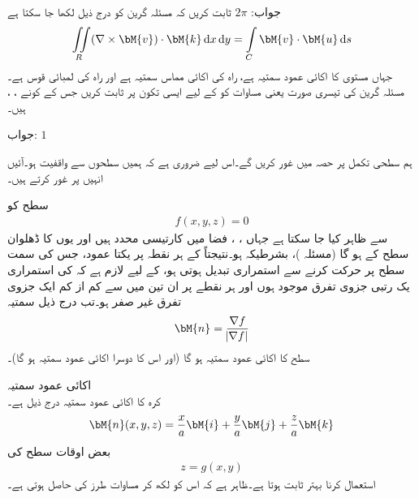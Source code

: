 جواب:\quad
$2\pi$
ثابت کریں کہ مسئلہ گرین کو درج ذیل لکھا جا سکتا ہے
\begin{align}\label{مساوات_خطی_تکمل_مسئلہ_گرین_تیسری_صورت}
\iint\limits_R (\nabla \times \bM{v}) \cdot \bM{k}\dif x\dif y=\int\limits_C \bM{v}\cdot \bM{u}\dif s
\end{align}
جہاں  مستوی  کا  اکائی  عمود سمتیہ ہے،  راہ  کی اکائی مماس سمتیہ ہے اور  راہ  کی لمبائی قوس ہے۔
مسئلہ گرین کی تیسری صورت یعنی مساوات  کو  کے لیے ایسی تکون پر ثابت کریں جس کے کونے ، ،  ہیں۔

جواب:\quad
$1$

ہم سطحی تکمل پر حصہ  میں غور کریں گے۔اس لیے ضروری ہے کہ ہمیں سطحوں سے واقفیت ہو۔آئیں انہیں پر غور کرتے ہیں۔

سطح  کو 
\begin{align}\label{مساوات_خطی_تکمل_سطح_خفی_روپ}
f(x,y,z)=0
\end{align}
سے ظاہر کیا جا سکتا ہے جہاں ، ،  فضا میں کارتیسی محدد ہیں اور یوں  کا ڈھلوان سطح  کے   ہو گا (مسئلہ )، بشرطیکہ  ہو۔نتیجتاً  کے ہر نقطہ پر یکتا عمود، جس کی سمت سطح پر حرکت کرنے سے استمراری تبدیل ہوتی ہو، کے لیے لازم ہے کہ  کی استمراری یک رتبی جزوی تفرق موجود ہوں اور ہر نقطے پر ان تین میں سے کم از کم ایک جزوی تفرق غیر صفر ہو۔تب درج ذیل سمتیہ
\begin{align}
\bM{n}=\frac{\nabla f}{\abs{\nabla f}}
\end{align}
سطح  کا اکائی عمود سمتیہ ہو گا (اور  اس کا دوسرا اکائی عمود سمتیہ ہو گا)۔

\quad اکائی عمود سمتیہ\\
کرہ  کا اکائی عمود سمتیہ درج ذیل ہے۔
\begin{align*}
\bM{n}(x,y,z)=\frac{x}{a}\bM{i}+\frac{y}{a}\bM{j}+\frac{z}{a}\bM{k}
\end{align*}
بعض اوقات سطح کی 
\begin{align}\label{مساوات_خطی_تکمل_سطح_صریح_روپ}
z=g(x,y)
\end{align}
استعمال کرنا بہتر ثابت ہوتا ہے۔ظاہر ہے کہ اس کو  لکھ کر  مساوات  طرز  کی  حاصل ہوتی ہے۔


